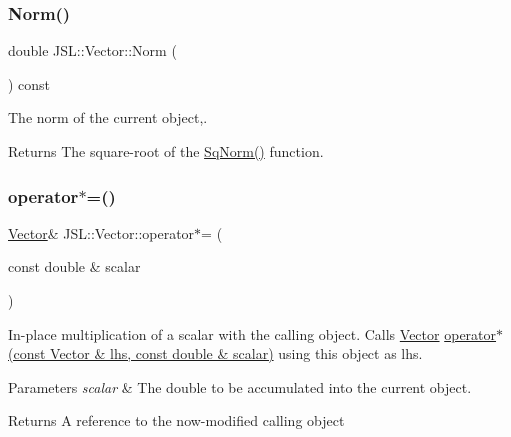 \subsubsection{\texorpdfstring{Norm()}{Norm()}}
{\footnotesize\ttfamily double J\+S\+L\+::\+Vector\+::\+Norm (\begin{DoxyParamCaption}{ }\end{DoxyParamCaption}) const\hspace{0.3cm}{\ttfamily [inline]}}



The norm of the current object,. 

\begin{DoxyReturn}{Returns}
The square-\/root of the \hyperlink{classJSL_1_1Vector_ac1346e26bc981bf45d2c1c4317dac4e6}{Sq\+Norm()} function. 
\end{DoxyReturn}
\mbox{\label{classJSL_1_1Vector_ad2fb2b88e3447881c1dac08897c5c8a8}} 
\subsubsection{\texorpdfstring{operator$\ast$=()}{operator*=()}}
{\footnotesize\ttfamily \hyperlink{classJSL_1_1Vector}{Vector}\& J\+S\+L\+::\+Vector\+::operator$\ast$= (\begin{DoxyParamCaption}\item[{const double \&}]{scalar }\end{DoxyParamCaption})\hspace{0.3cm}{\ttfamily [inline]}}



In-\/place multiplication of a scalar with the calling object. Calls \hyperlink{classJSL_1_1Vector}{Vector} \hyperlink{namespaceJSL_afc5e092de4a9bdc5795d40ee0f51c7b9}{operator$\ast$(const Vector \& lhs, const double \& scalar)} using this object as lhs. 


\begin{DoxyParams}{Parameters}
{\em scalar} & The double to be accumulated into the current object. \\
\hline
\end{DoxyParams}
\begin{DoxyReturn}{Returns}
A reference to the now-\/modified calling object 
\end{DoxyReturn}
\mbox{\label{classJSL_1_1Vector_ad46bf395dd6122ce152c33aad2672a9b}} 
